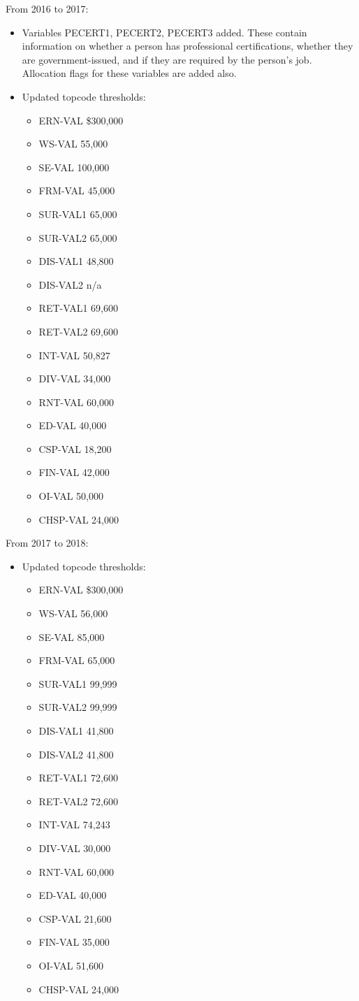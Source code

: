 \documentclass{article}
\begin{document}
From 2016 to 2017:
\begin{itemize}
	\item Variables PECERT1, PECERT2, PECERT3 added. These contain information on whether a person has professional certifications, whether they are government-issued, and if they are required by the person's job. Allocation flags for these variables are added also. 
	\item Updated topcode thresholds:
	\begin{itemize}
		\item ERN-VAL \$300,000
		\item WS-VAL	55,000 
		\item SE-VAL 100,000
		\item FRM-VAL 45,000  
		\item SUR-VAL1 65,000
		\item SUR-VAL2 65,000 
		\item DIS-VAL1 48,800
		\item DIS-VAL2  n/a
		\item RET-VAL1 69,600
		\item RET-VAL2 69,600
		\item INT-VAL 50,827
		\item DIV-VAL 34,000
		\item RNT-VAL 60,000
		\item ED-VAL 40,000
		\item CSP-VAL 18,200
		\item FIN-VAL 42,000
		\item OI-VAL 50,000
		\item CHSP-VAL 24,000
	\end{itemize}
\end{itemize}

From 2017 to 2018:
\begin{itemize}
	\item Updated topcode thresholds:
	\begin{itemize}
		\item ERN-VAL \$300,000
		\item WS-VAL	56,000 
		\item SE-VAL 85,000
		\item FRM-VAL 65,000  
		\item SUR-VAL1 99,999
		\item SUR-VAL2 99,999 
		\item DIS-VAL1 41,800
		\item DIS-VAL2 41,800
		\item RET-VAL1 72,600
		\item RET-VAL2 72,600
		\item INT-VAL 74,243
		\item DIV-VAL 30,000
		\item RNT-VAL 60,000
		\item ED-VAL 40,000
		\item CSP-VAL 21,600
		\item FIN-VAL 35,000
		\item OI-VAL 51,600
		\item CHSP-VAL 24,000
	\end{itemize}
\end{itemize}
\end{document}
